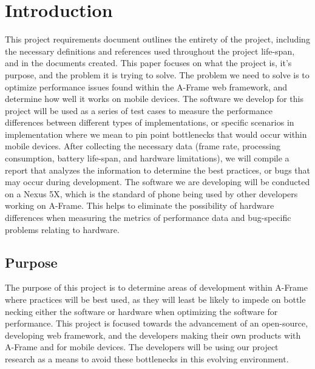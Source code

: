 \documentclass[letterpaper,10pt,titlepage,draftclsnofoot,onecolumn,compsoc,utf8,latin1]{IEEEtran}
\begin{document}
\section{Introduction}
\begin{singlespace}
\noindent
This project requirements document outlines the entirety of the project, including the necessary definitions and references used throughout the project life-span, and in the documents created. This paper focuses on what the project is, it's purpose, and the problem it is trying to solve. The problem we need to solve is to optimize performance issues found within the A-Frame web framework, and determine how well it works on mobile devices. The software we develop for this project will be used as a series of test cases to measure the performance differences between different types of implementations, or specific scenarios in implementation where we mean to pin point bottlenecks that would occur within mobile devices. After collecting the necessary data (frame rate, processing consumption, battery life-span, and hardware limitations), we will compile a report that analyzes the information to determine the best practices, or bugs that may occur during development. The software we are developing will be conducted on a Nexus 5X, which is the standard of phone being used by other developers working on A-Frame. This helps to eliminate the possibility of hardware differences when measuring the metrics of performance data and bug-specific problems relating to hardware.
\end{singlespace}

\subsection{Purpose}
\begin{singlespace}
\noindent
The purpose of this project is to determine areas of development within A-Frame where practices will be best used, as they will least be likely to impede on bottle necking either the software or hardware when optimizing the software for performance. This project is focused towards the advancement of an open-source, developing web framework, and the developers making their own products with A-Frame and for mobile devices. The developers will be using our project research as a means to avoid these bottlenecks in this evolving environment.
\end{singlespace}
\end{document}
